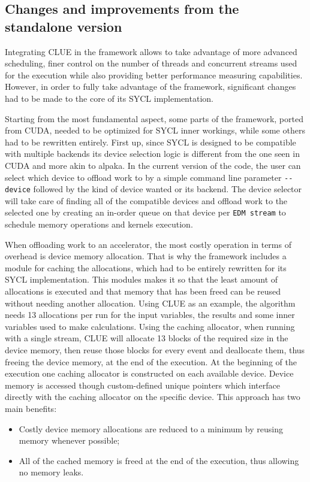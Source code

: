 \subsection{Changes and improvements from the standalone version}
Integrating CLUE in the framework allows to take advantage of more advanced scheduling, finer control on the number of threads and concurrent streams used for the execution while also providing better performance measuring capabilities. However, in order to fully take advantage of the framework, significant changes had to be made to the core of its SYCL implementation. 

Starting from the most fundamental aspect, some parts of the framework, ported from CUDA, needed to be optimized for SYCL inner workings, while some others had to be rewritten entirely. First up, since SYCL is designed to be compatible with multiple backends its device selection logic is different from the one seen in CUDA and more akin to alpaka. In the current version of the code, the user can select which device to offload work to by a simple command line parameter \Verb "--device" followed by the kind of device wanted or its backend. The device selector will take care of finding all of the compatible devices and offload work to the selected one by creating an in-order queue on that device per \Verb "EDM stream" to schedule memory operations and kernels execution.

When offloading work to an accelerator, the most costly operation in terms of overhead is device memory allocation. That is why the framework includes a module for caching the allocations, which had to be entirely rewritten for its SYCL implementation. This modules makes it so that the least amount of allocations is executed and that memory that has been freed can be reused without needing another allocation. Using CLUE as an example, the algorithm needs 13 allocations per run for the input variables, the results and some inner variables used to make calculations. Using the caching allocator, when running with a single stream, CLUE will allocate 13 blocks of the required size in the device memory, then reuse those blocks for every event and deallocate them, thus freeing the device memory, at the end of the execution. At the beginning of the execution one caching allocator is constructed on each available device. Device memory is accessed though custom-defined unique pointers which interface directly with the caching allocator on the specific device. This approach has two main benefits:
\begin{itemize}
    \item Costly device memory allocations are reduced to a minimum by reusing memory whenever possible;
    \item All of the cached memory is freed at the end of the execution, thus allowing no memory leaks.
\end{itemize}

